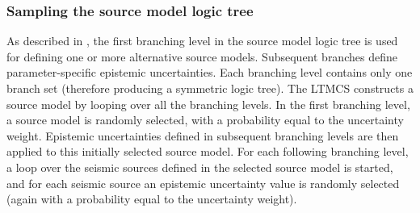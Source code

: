 \subsubsection{Sampling the source model logic tree}
As described in \label{hazard:source_model_logic_tree}, the first branching 
level in the source model logic tree is used for defining one or more 
alternative source models. Subsequent branches define parameter-specific 
epistemic uncertainties. Each branching level contains only one branch set 
(therefore producing a symmetric logic tree). The LTMCS constructs a source 
model by looping over all the branching levels. In the first branching level, 
a source model is randomly selected, with a probability equal to the 
uncertainty weight. Epistemic uncertainties defined in subsequent branching 
levels are then applied to this initially selected source model. For each 
following branching level, a loop over the seismic sources defined in the 
selected source model is started, and for each seismic source an epistemic 
uncertainty value is randomly selected (again with a probability equal to 
the uncertainty weight).